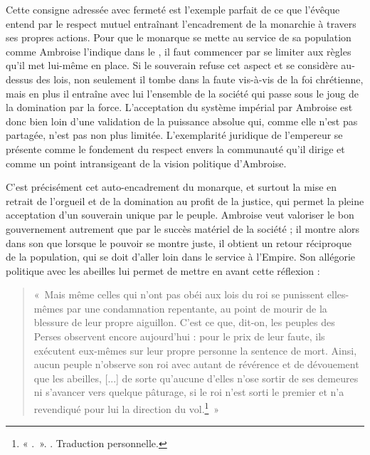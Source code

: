 \bigskip

Cette consigne adressée avec fermeté est l'exemple parfait de ce que l'évêque entend par le respect mutuel entraînant l'encadrement de la monarchie à travers ses propres actions. Pour que le monarque se mette au service de sa population comme Ambroise l'indique dans le , il faut commencer par se limiter aux règles qu'il met lui-même en place. Si le souverain refuse cet aspect et se considère au-dessus des lois, non seulement il tombe dans la faute vis-à-vis de la foi chrétienne, mais en plus il entraîne avec lui l'ensemble de la société qui passe sous le joug de la domination par la force. L'acceptation du système impérial par Ambroise est donc bien loin d'une validation de la puissance absolue qui, comme elle n'est pas partagée, n'est pas non plus limitée. L'exemplarité juridique de l'empereur se présente comme le fondement du respect envers la communauté qu'il dirige et comme un point intransigeant de la vision politique d'Ambroise.

\bigskip

C'est précisément cet auto-encadrement du monarque, et surtout la mise en retrait de l'orgueil et de la domination au profit de la justice, qui permet la pleine acceptation d'un souverain unique par le peuple. Ambroise veut valoriser le bon gouvernement autrement que par le succès matériel de la société ; il montre alors dans son  que lorsque le pouvoir se montre juste, il obtient un retour réciproque de la population, qui se doit d'aller loin dans le service à l'Empire. Son allégorie politique avec les abeilles lui permet de mettre en avant cette réflexion :

\bigskip

\begin{quote}
    «~Mais même celles qui n'ont pas obéi aux lois du roi se punissent elles-mêmes par une condamnation repentante, au point de mourir de la blessure de leur propre aiguillon. C'est ce que, dit-on, les peuples des Perses observent encore aujourd'hui : pour le prix de leur faute, ils exécutent eux-mêmes sur leur propre personne la sentence de mort. Ainsi, aucun peuple n'observe son roi avec autant de révérence et de dévouement que les abeilles, [...] de sorte qu'aucune d'elles n'ose sortir de ses demeures ni s'avancer vers quelque pâturage, si le roi n'est sorti le premier et n'a revendiqué pour lui la direction du vol.\footnote{« .~». \cite[\nopp V, 21, 68]{ambroise_csel_32_1}. Traduction personnelle.}~»
\end{quote}

